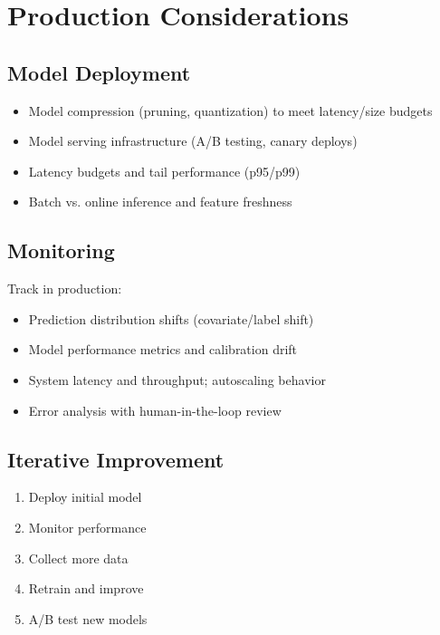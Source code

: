 
\section{Production Considerations }
\label{sec:production}

\subsection{Model Deployment}

\begin{itemize}
    \item Model compression (pruning, quantization) to meet latency/size budgets
    \item Model serving infrastructure (A/B testing, canary deploys)
    \item Latency budgets and tail performance (p95/p99)
    \item Batch vs. online inference and feature freshness
\end{itemize}

\subsection{Monitoring}

Track in production:
\begin{itemize}
    \item Prediction distribution shifts (covariate/label shift) 
    \item Model performance metrics and calibration drift
    \item System latency and throughput; autoscaling behavior
    \item Error analysis with human-in-the-loop review
\end{itemize}

\subsection{Iterative Improvement}

\begin{enumerate}
    \item Deploy initial model
    \item Monitor performance
    \item Collect more data
    \item Retrain and improve
    \item A/B test new models
\end{enumerate}

